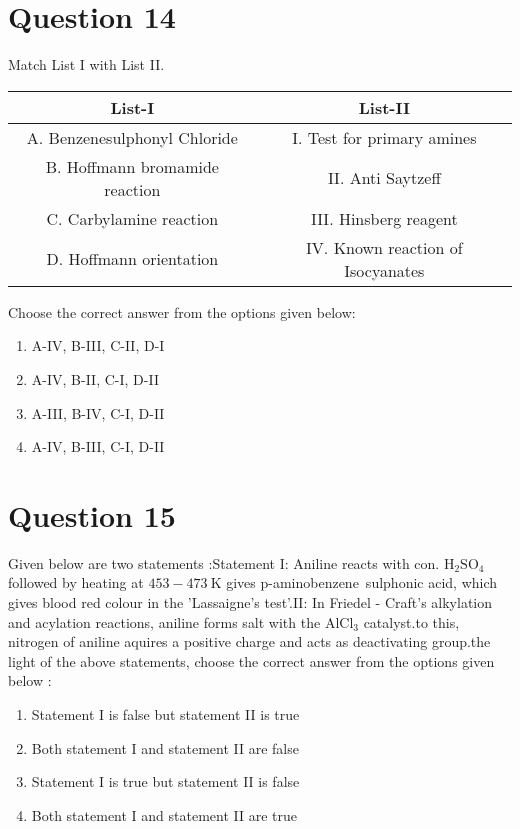 \documentclass{article}
\begin{document}
\section*{Question 14}
Match List I with List II.
    \setlength{\arrayrulewidth}{1mm}
    \begin{tabular}{|c|c|}
    \hline
    List-I & List-II \\
\hline
A. Benzenesulphonyl Chloride & I. Test for primary amines \\
\hline
B. Hoffmann bromamide reaction & II. Anti Saytzeff \\
\hline
C. Carbylamine reaction & III. Hinsberg reagent \\
\hline
D. Hoffmann orientation & IV. Known reaction of Isocyanates \\
\hline

    \end{tabular}
    \setlength{\arrayrulewidth}{0.4mm}
    Choose the correct answer from the options given below: \newline
\begin{enumerate}[label=(\alph*)]
\item A-IV, B-III, C-II, D-I
\item A-IV, B-II, C-I, D-II
\item A-III, B-IV, C-I, D-II
\item A-IV, B-III, C-I, D-II
\end{enumerate}
\newpage
\section*{Question 15}
Given below are two statements :Statement I: Aniline reacts with con. \(\mathrm{H}_2 \mathrm{SO}_4\) followed by heating at \(453-473 \mathrm{~K}\) gives p-aminobenzene sulphonic acid, which gives blood red colour in the 'Lassaigne's test'.\newlineStatement II: In Friedel - Craft's alkylation and acylation reactions, aniline forms salt with the \(\mathrm{AlCl}_3\) catalyst.\newlineDue to this, nitrogen of aniline aquires a positive charge and acts as deactivating group.\newlineIn the light of the above statements, choose the correct answer from the options given below :
\begin{enumerate}[label=(\alph*)]
\item Statement I is false but statement II is true
\item Both statement I and statement II are false
\item Statement I is true but statement II is false
\item Both statement I and statement II are true
\end{enumerate}
\newpage
\end{document}

